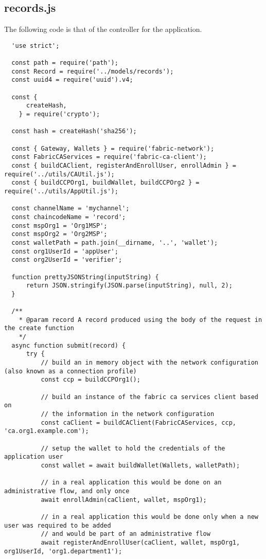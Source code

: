 \subsection{records.js}
The following code is that of the controller for the application. \label{appendix:controller}
\begin{lstlisting}
  'use strict';

  const path = require('path');
  const Record = require('../models/records');
  const uuid4 = require('uuid').v4;
  
  const {
      createHash,
    } = require('crypto');
  
  const hash = createHash('sha256');
  
  const { Gateway, Wallets } = require('fabric-network');
  const FabricCAServices = require('fabric-ca-client');
  const { buildCAClient, registerAndEnrollUser, enrollAdmin } = require('../utils/CAUtil.js');
  const { buildCCPOrg1, buildWallet, buildCCPOrg2 } = require('../utils/AppUtil.js');
  
  const channelName = 'mychannel';
  const chaincodeName = 'record';
  const mspOrg1 = 'Org1MSP';
  const mspOrg2 = 'Org2MSP';
  const walletPath = path.join(__dirname, '..', 'wallet');
  const org1UserId = 'appUser';
  const org2UserId = 'verifier';
  
  function prettyJSONString(inputString) {
      return JSON.stringify(JSON.parse(inputString), null, 2);
  }
  
  /**
    * @param record A record produced using the body of the request in the create function
    */
  async function submit(record) {
      try {
          // build an in memory object with the network configuration (also known as a connection profile)
          const ccp = buildCCPOrg1();
  
          // build an instance of the fabric ca services client based on
          // the information in the network configuration
          const caClient = buildCAClient(FabricCAServices, ccp, 'ca.org1.example.com');
  
          // setup the wallet to hold the credentials of the application user
          const wallet = await buildWallet(Wallets, walletPath);
  
          // in a real application this would be done on an administrative flow, and only once
          await enrollAdmin(caClient, wallet, mspOrg1);
  
          // in a real application this would be done only when a new user was required to be added
          // and would be part of an administrative flow
          await registerAndEnrollUser(caClient, wallet, mspOrg1, org1UserId, 'org1.department1');
  

\end{lstlisting}
